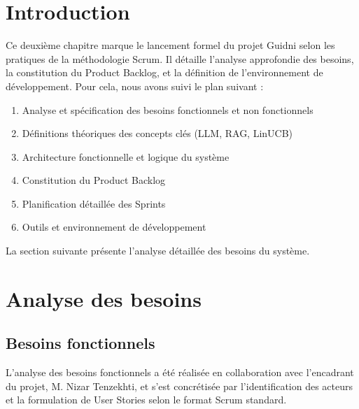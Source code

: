 
\section{Introduction}

Ce deuxième chapitre marque le lancement formel du projet Guidni selon les pratiques de la méthodologie Scrum. Il détaille l'analyse approfondie des besoins, la constitution du Product Backlog, et la définition de l'environnement de développement. Pour cela, nous avons suivi le plan suivant :

\begin{enumerate}
    \item Analyse et spécification des besoins fonctionnels et non fonctionnels
    \item Définitions théoriques des concepts clés (LLM, RAG, LinUCB)
    \item Architecture fonctionnelle et logique du système
    \item Constitution du Product Backlog
    \item Planification détaillée des Sprints
    \item Outils et environnement de développement
\end{enumerate}

La section suivante présente l'analyse détaillée des besoins du système.


\section{Analyse des besoins}

\subsection{Besoins fonctionnels}

L'analyse des besoins fonctionnels a été réalisée en collaboration avec l'encadrant du projet, M. Nizar Tenzekhti, et s'est concrétisée par l'identification des acteurs et la formulation de User Stories selon le format Scrum standard.

